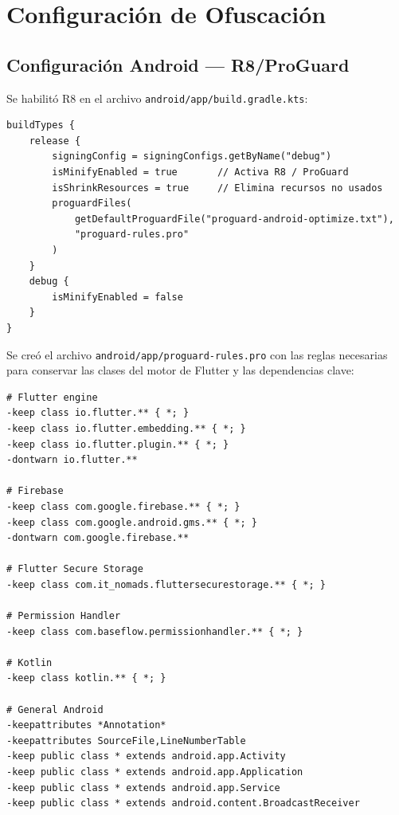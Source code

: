 \documentclass[12pt,a4paper]{article}
\begin{document}
\section{Configuración de Ofuscación}

\subsection{Configuración Android — R8/ProGuard}

Se habilitó R8 en el archivo \texttt{android/app/build.gradle.kts}:

\begin{lstlisting}[style=gradle, caption={build.gradle.kts — configuración de release con R8}]
buildTypes {
    release {
        signingConfig = signingConfigs.getByName("debug")
        isMinifyEnabled = true       // Activa R8 / ProGuard
        isShrinkResources = true     // Elimina recursos no usados
        proguardFiles(
            getDefaultProguardFile("proguard-android-optimize.txt"),
            "proguard-rules.pro"
        )
    }
    debug {
        isMinifyEnabled = false
    }
}
\end{lstlisting}

Se creó el archivo \texttt{android/app/proguard-rules.pro} con las reglas necesarias para conservar las clases del motor de Flutter y las dependencias clave:

\begin{lstlisting}[style=dart, caption={proguard-rules.pro}]
# Flutter engine
-keep class io.flutter.** { *; }
-keep class io.flutter.embedding.** { *; }
-keep class io.flutter.plugin.** { *; }
-dontwarn io.flutter.**

# Firebase
-keep class com.google.firebase.** { *; }
-keep class com.google.android.gms.** { *; }
-dontwarn com.google.firebase.**

# Flutter Secure Storage
-keep class com.it_nomads.fluttersecurestorage.** { *; }

# Permission Handler
-keep class com.baseflow.permissionhandler.** { *; }

# Kotlin
-keep class kotlin.** { *; }

# General Android
-keepattributes *Annotation*
-keepattributes SourceFile,LineNumberTable
-keep public class * extends android.app.Activity
-keep public class * extends android.app.Application
-keep public class * extends android.app.Service
-keep public class * extends android.content.BroadcastReceiver
\end{lstlisting}
\end{document}
